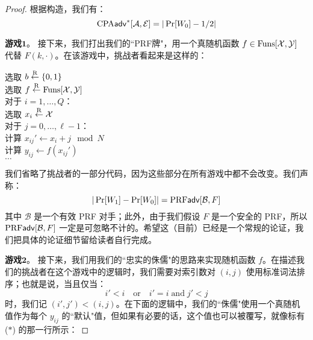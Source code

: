 \begin{proof}
\vspace{5pt}

根据构造，我们有：
\begin{equation}\label{eq:5-16}
{\rm CPA}\mathsf{adv}^*[\mathcal{A},\mathcal{E}]= |\Pr[W_0]-{1}/{2}|
\end{equation}

\noindent\textbf{游戏$\mathbf{1}$}。
接下来，我们打出我们的``PRF牌"，用一个真随机函数 $f\in{\rm Funs}[\mathcal{X},\mathcal{Y}]$ 代替 $F(k,\cdot)$。在该游戏中，挑战者看起来是这样的：

\vspace{5pt}

\hspace*{5pt} 选取 $b\overset{\rm R}\leftarrow\{0,1\}$\\
\hspace*{26pt} 选取 $f\overset{\rm R}\leftarrow{\rm Funs}[\mathcal{X},\mathcal{Y}]$\\
\hspace*{26pt} 对于 $i=1,\dots,Q$：\\
\hspace*{50pt} 选取 $x_i\overset{\rm R}\leftarrow\mathcal{X}$\\
\hspace*{50pt} 对于 $j=0,\dots,\ell-1$：\\
\hspace*{75pt} 计算 $x_{ij}'\leftarrow x_i+j\mod N$\\
\hspace*{75pt} 计算 $y_{ij}\leftarrow f(x_{ij}')$\\
\hspace*{26pt} $\dots$

\vspace{5pt}

我们省略了挑战者的一部分代码，因为这些部分在所有游戏中都不会改变。我们声称：
\begin{equation}\label{eq:5-17}
|\Pr[W_1]-\Pr[W_0]|={\rm PRF}\mathsf{adv}[\mathcal{B},F]
\end{equation}
其中 $\mathcal{B}$ 是一个有效 PRF 对手；此外，由于我们假设 $F$ 是一个安全的 PRF，所以 ${\rm PRF}\mathsf{adv}[\mathcal{B},F]$ 一定是可忽略不计的。希望这（目前）已经是一个常规的论证，我们把具体的论证细节留给读者自行完成。

\vspace{5pt}

\noindent\textbf{游戏$\mathbf{2}$}。
接下来，我们用我们的``忠实的侏儒"的思路来实现随机函数 $f$。在描述我们的挑战者在这个游戏中的逻辑时，我们需要对索引数对 $(i,j)$ 使用标准词法排序；也就是说，当且仅当：
\[
i'<i
\quad\text{or}\quad
i'=i
\;\text{and}\;
j'<j
\]
时，我们记 $(i',j')<(i,j)$。在下面的逻辑中，我们的``侏儒"使用一个真随机值作为每个 $y_{ij}$ 的``默认"值，但如果有必要的话，这个值也可以被覆写，就像标有 ($*$) 的那一行所示：


\end{proof}
